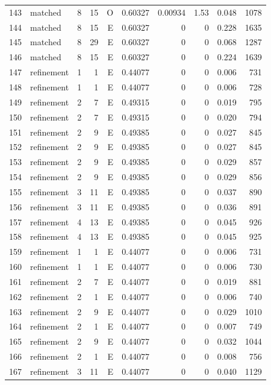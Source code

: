 \begin{longtable}{rlrrrrrrrr}
143 & matched & 8 & 15 & O & 0.60327 & 0.00934 & 1.53 & 0.048 & 1078 \\
144 & matched & 8 & 15 & E & 0.60327 & 0 & 0 & 0.228 & 1635 \\
145 & matched & 8 & 29 & E & 0.60327 & 0 & 0 & 0.068 & 1287 \\
146 & matched & 8 & 15 & E & 0.60327 & 0 & 0 & 0.224 & 1639 \\
147 & refinement & 1 & 1 & E & 0.44077 & 0 & 0 & 0.006 & 731 \\
148 & refinement & 1 & 1 & E & 0.44077 & 0 & 0 & 0.006 & 728 \\
149 & refinement & 2 & 7 & E & 0.49315 & 0 & 0 & 0.019 & 795 \\
150 & refinement & 2 & 7 & E & 0.49315 & 0 & 0 & 0.020 & 794 \\
151 & refinement & 2 & 9 & E & 0.49385 & 0 & 0 & 0.027 & 845 \\
152 & refinement & 2 & 9 & E & 0.49385 & 0 & 0 & 0.027 & 845 \\
153 & refinement & 2 & 9 & E & 0.49385 & 0 & 0 & 0.029 & 857 \\
154 & refinement & 2 & 9 & E & 0.49385 & 0 & 0 & 0.029 & 856 \\
155 & refinement & 3 & 11 & E & 0.49385 & 0 & 0 & 0.037 & 890 \\
156 & refinement & 3 & 11 & E & 0.49385 & 0 & 0 & 0.036 & 891 \\
157 & refinement & 4 & 13 & E & 0.49385 & 0 & 0 & 0.045 & 926 \\
158 & refinement & 4 & 13 & E & 0.49385 & 0 & 0 & 0.045 & 925 \\
159 & refinement & 1 & 1 & E & 0.44077 & 0 & 0 & 0.006 & 731 \\
160 & refinement & 1 & 1 & E & 0.44077 & 0 & 0 & 0.006 & 730 \\
161 & refinement & 2 & 7 & E & 0.44077 & 0 & 0 & 0.019 & 881 \\
162 & refinement & 2 & 1 & E & 0.44077 & 0 & 0 & 0.006 & 740 \\
163 & refinement & 2 & 9 & E & 0.44077 & 0 & 0 & 0.029 & 1010 \\
164 & refinement & 2 & 1 & E & 0.44077 & 0 & 0 & 0.007 & 749 \\
165 & refinement & 2 & 9 & E & 0.44077 & 0 & 0 & 0.032 & 1044 \\
166 & refinement & 2 & 1 & E & 0.44077 & 0 & 0 & 0.008 & 756 \\
167 & refinement & 3 & 11 & E & 0.44077 & 0 & 0 & 0.040 & 1129 \\

\end{longtable}

